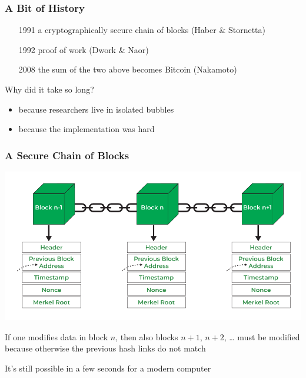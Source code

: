\documentclass[11pt]{beamer}  %
\begin{document}
\begin{frame}\frametitle{A Bit of History}

  \begin{itemize}
  \item[1991] a cryptographically secure chain of blocks (Haber \& Stornetta)
  \item[1992] proof of work (Dwork \& Naor)
  \item[2008] the sum of the two above becomes Bitcoin (Nakamoto)
  \end{itemize}

  \bigskip

  \begin{greenbox}{Why did it take so long?}
    \begin{itemize}
    \item because researchers live in isolated bubbles
    \item because the implementation was hard
    \end{itemize}
  \end{greenbox}

\end{frame}

\begin{frame}\frametitle{A Secure Chain of Blocks}

  \begin{center}
    \includegraphics[scale=0.26,clip=false]{pictures/blocks.png}
  \end{center}

  If one modifies data in block $n$, then also blocks $n+1$, $n+2$, \ldots
  must be modified because otherwise the previous hash links do not match

  \medskip

  \begin{redbox}{}
    It's still possible in a few seconds for a modern computer
  \end{redbox}
  
\end{frame}
\end{document}
